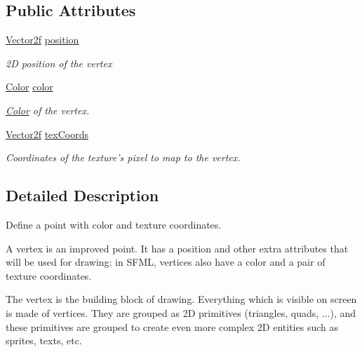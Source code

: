 \subsection*{Public Attributes}
\begin{DoxyCompactItemize}
\item 
\hypertarget{classsf_1_1_vertex_a8a4e0f4dfa7f1eb215c92e93d04f0ac0}{\hyperlink{classsf_1_1_vector2}{Vector2f} \hyperlink{classsf_1_1_vertex_a8a4e0f4dfa7f1eb215c92e93d04f0ac0}{position}}\label{classsf_1_1_vertex_a8a4e0f4dfa7f1eb215c92e93d04f0ac0}

\begin{DoxyCompactList}\small\item\em 2\+D position of the vertex \end{DoxyCompactList}\item 
\hypertarget{classsf_1_1_vertex_a799faa0629442e90f07cd2edb568ff80}{\hyperlink{classsf_1_1_color}{Color} \hyperlink{classsf_1_1_vertex_a799faa0629442e90f07cd2edb568ff80}{color}}\label{classsf_1_1_vertex_a799faa0629442e90f07cd2edb568ff80}

\begin{DoxyCompactList}\small\item\em \hyperlink{classsf_1_1_color}{Color} of the vertex. \end{DoxyCompactList}\item 
\hypertarget{classsf_1_1_vertex_a9e79bd05818d36c4789751908037097c}{\hyperlink{classsf_1_1_vector2}{Vector2f} \hyperlink{classsf_1_1_vertex_a9e79bd05818d36c4789751908037097c}{tex\+Coords}}\label{classsf_1_1_vertex_a9e79bd05818d36c4789751908037097c}

\begin{DoxyCompactList}\small\item\em Coordinates of the texture's pixel to map to the vertex. \end{DoxyCompactList}\end{DoxyCompactItemize}


\subsection{Detailed Description}
Define a point with color and texture coordinates. 

A vertex is an improved point. It has a position and other extra attributes that will be used for drawing\+: in S\+F\+M\+L, vertices also have a color and a pair of texture coordinates.

The vertex is the building block of drawing. Everything which is visible on screen is made of vertices. They are grouped as 2\+D primitives (triangles, quads, ...), and these primitives are grouped to create even more complex 2\+D entities such as sprites, texts, etc.

